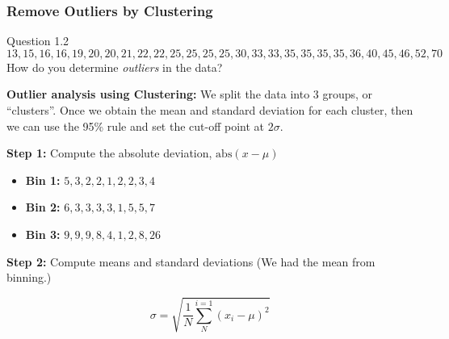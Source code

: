 \documentclass[aspectratio=169, 10pt]{beamer}
\begin{document}
\begin{frame}[t]
    \frametitle{Remove Outliers by Clustering}

    \begin{block}{Question 1.2}
        \[13,15,16,16,19,20,20,21,22,22,25,25,25,25,30,33,33,35,35,35,35,36,40,45,46,52,70\]
        How do you determine \textit{outliers} in the data?
    \end{block}

    \textbf{Outlier analysis using Clustering:} We split the data into 3 groups, or ``clusters''.
    Once we obtain the mean and standard deviation for each cluster, 
    then we can use the 95\% rule and set the cut-off point at $2\sigma$.

    \textbf{Step 1:} Compute the absolute deviation, $\text{abs}(x - \mu)$

    \begin{itemize}
        \item \textbf{Bin 1:} $5, 3, 2, 2, 1, 2, 2, 3, 4$
        \item \textbf{Bin 2:} $6, 3, 3, 3, 3, 1, 5, 5, 7$
        \item \textbf{Bin 3:} $ 9,  9,  9,  8,  4,  1,  2,  8, 26$
    \end{itemize}

    \textbf{Step 2:} Compute means and standard deviations (We had the mean from binning.) 

    \[\sigma = \sqrt{\frac{1}{N}\sum_{N}^{i=1}(x_i-\mu)^2}\]

\end{frame}
\end{document}
